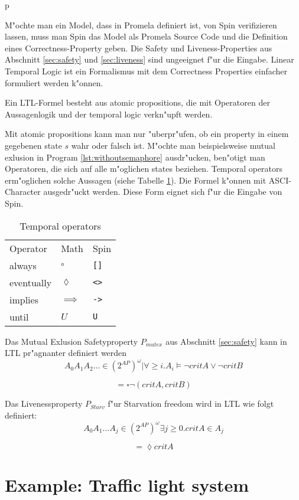 p\documentclass[a4paper, twoside]{article}
\begin{document}
M"ochte man ein Model, dass in Promela definiert ist, von Spin verifizieren lassen, muss man Spin das Model als Promela Source Code und die Definition eines Correctness-Property geben. Die Safety und Liveness-Properties aus Abschnitt \ref{sec:safety} und \ref{sec:liveness} sind ungeeignet f"ur die Eingabe. Linear Temporal Logic ist ein Formalismus mit dem Correctness Properties einfacher formuliert werden k"onnen.

Ein LTL-Formel besteht aus atomic propositions, die mit Operatoren der Aussagenlogik  und der temporal logic verkn"upft werden.

Mit atomic propositions kann man nur "uberpr"ufen, ob ein property in einem gegebenen state $s$ wahr oder falsch ist. M"ochte man beispielsweise mutual exlusion in Program \ref{lst:withoutsemaphore} ausdr"ucken, ben"otigt man Operatoren, die sich auf alle m"oglichen states beziehen. Temporal operators erm"oglichen solche Aussagen (siehe Tabelle \ref{tab:temporal_operators}). Die Formel k"onnen mit ASCI-Character ausgedr"uckt werden. Diese Form eignet sich f"ur die Eingabe von Spin.

\begin{table}
  \centering
  \begin{tabular}{l l l}
    Operator & Math & Spin \\
    always & $\square$ & \verb|[]| \\
    eventually & $\lozenge$ & \verb|<>| \\
    implies & $\implies$ & \verb|->| \\
    until & $U$ & \verb|U|
  \end{tabular}
  \caption{Temporal operators }
  \label{tab:temporal_operators}
\end{table}

Das Mutual Exlusion Safetyproperty $P_{mutex}$ aus Abschnitt \ref{sec:safety} kann in LTL pr"agnanter definiert werden
\[
  {A_0 A_1 A_2 \dots \in (2^{AP})^{\omega} | \forall \geq i.   A_i \models \neg critA \lor \neg critB}
\]

\[
= \square \neg (critA,critB)
\]

Das Livenessproperty $P_{Starv}$ f"ur Starvation freedom wird in LTL wie folgt definiert:
\[
 { A_0 A_1 \dots A_j \in (2^{AP})^{\omega} \exists j \geq 0. critA \in A_j}
\]

\[
= \lozenge critA
\]

\section{Example: Traffic light system}
\label{sec:example}
\end{document}

